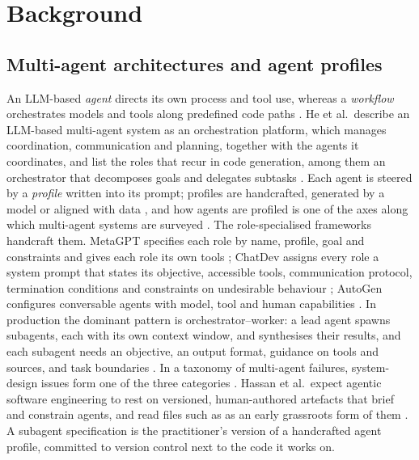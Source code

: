 \section{Background}
\label{sec:background}

\subsection{Multi-agent architectures and agent profiles}
\label{sec:bg-mas}
An LLM-based \emph{agent} directs its own process and tool use, whereas a \emph{workflow} orchestrates models and tools
along predefined code paths \citep{anthropic2024buildingagents}. He et al.\ describe an LLM-based multi-agent system as
an orchestration platform, which manages coordination, communication and planning, together with the agents it
coordinates, and list the roles that recur in code generation, among them an orchestrator that decomposes goals and
delegates subtasks \citep[\S2.3, \S3.2]{he2025lmase}. Each agent is steered by a \emph{profile} written into its prompt;
profiles are handcrafted, generated by a model or aligned with data \citep[\S2.1.1]{wang2024survey}, and how agents are
profiled is one of the axes along which multi-agent systems are surveyed \citep{guo2024lmmas}. The role-specialised
frameworks handcraft them. MetaGPT specifies each role by name, profile, goal and constraints and gives each role its
own tools \citep[\S3.1]{hong2024metagpt}; ChatDev assigns every role a system prompt that states its objective,
accessible tools, communication protocol, termination conditions and constraints on undesirable behaviour
\citep[\S3.1]{qian-etal-2024-chatdev}; AutoGen configures conversable agents with model, tool and human capabilities
\citep[\S2.1]{wu2024autogen}. In production the dominant pattern is orchestrator--worker: a lead agent spawns
subagents, each with its own context window, and synthesises their results, and each subagent needs an objective, an
output format, guidance on tools and sources, and task boundaries \citep{anthropic2025multiagentresearch}. In a taxonomy of
multi-agent failures, system-design issues form one of the three categories \citep{cemri2025mast}. Hassan et al.\ expect agentic software engineering to rest on versioned, human-authored
artefacts that brief and constrain agents, and read files such as  as an early grassroots form of them
\citep[\S5.3]{hassan2025sase}. A subagent specification is the practitioner's version of a handcrafted agent profile,
committed to version control next to the code it works on.

